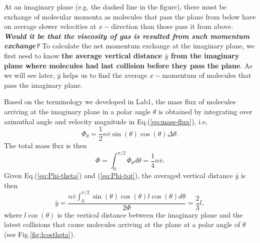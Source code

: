 At an imaginary plane (e.g. the dashed line in the figure), there must be exchange of molecular momenta as molecules that pass the plane from below have on average slower velocities at $ x- $direction than those pass it from above. \textit{\textbf{Would it be that the viscosity of gas is resulted from such momentum exchange?}} To calculate the net momentum exchange at the imaginary plane, we first need to know \textbf{the average vertical distance $ \bar{y} $ from the imaginary plane where molecules had last collision before they pass the plane}.  As we will see later, $ \bar{y} $ helps us to find the average $ x- $momentum of molecules that pass the imaginary plane.

Based on the terminology we developed in Lab1, the mass flux of molecules arriving at the imaginary plane in a polar angle $ \theta $ is obtained by integrating over azimuthal angle and velocity magnitude in Eq.(\ref{eq:mass-flux}), i.e,
\begin{equation}
	\Phi_{\theta} = \frac{1}{2}n\bar{v}\sin(\theta)\cos(\theta)\Delta \theta.
	\label{eq:Phi-theta}
\end{equation}
The total mass flux is then
\begin{equation}
	\Phi =\int_0^{\pi/2}\Phi_{\theta}d\theta =\frac{1}{4}n\bar{v}.
	\label{eq:Phi-tot}
\end{equation}
Given Eq.(\ref{eq:Phi-theta}) and (\ref{eq:Phi-tot}), the averaged vertical distance $\bar{y}$ is then
\begin{equation}
	\bar{y} = \frac{n\bar{v}\int_0^{\pi/2}\sin(\theta)\cos(\theta)l\cos(\theta)d\theta}{2\Phi}=\frac{2}{3}l,
	\label{eq:bar-y}
\end{equation}
where $ l\cos(\theta) $ is the vertical distance between the imaginary plane and the latest collisions that cause molecules arriving at the plane at a polar angle of $ \theta $ (see Fig.\ref{fig:lcostheta}).
